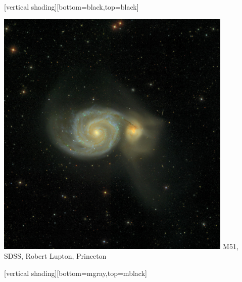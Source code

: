 \documentclass{beamer}
\begin{document}
{
    [vertical shading][bottom=black,top=black]

    \frame
    {	

        \begin{center}
            \includegraphics[trim=0 0 0 100,crop,width=0.85\textwidth]{M51-4x4.jpg}
            \newline
            M51, SDSS, Robert Lupton, Princeton
        \end{center}

    }
    [vertical shading][bottom=mgray,top=mblack]
}
\end{document}
